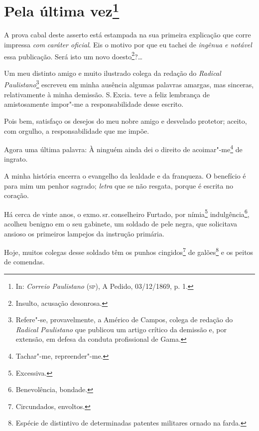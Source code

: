 \chapter{Pela última vez\footnote[*]{In: \emph{Correio Paulistano}
  (\textsc{sp}), A Pedido, 03/12/1869, p. 1.}}


A prova cabal deste asserto está estampada na sua primeira explicação
que corre impressa \emph{com} \emph{caráter oficial}. Eis o motivo por
que eu tachei de \emph{ingênua e notável} essa publicação. Será isto um
novo doesto\footnote{Insulto, acusação desonrosa.}?\ldots{}

Um meu distinto amigo e muito ilustrado colega da redação do
\emph{Radical Paulistano}\footnote{Refere"-se, provavelmente, a Américo
  de Campos, colega de redação do \emph{Radical Paulistano} que publicou
  um artigo crítico da demissão e, por extensão, em defesa da conduta
  profissional de Gama.} escreveu em minha ausência algumas palavras
amargas, mas sinceras, relativamente à minha demissão. S.\,Excia. teve a
feliz lembrança de amistosamente impor"-me a responsabilidade desse
escrito.

Pois bem, satisfaço os desejos do meu nobre amigo e desvelado protetor;
aceito, com orgulho, a responsabilidade que me impõe.

Agora uma última palavra:
À ninguém ainda dei o direito de acoimar"-me\footnote{Tachar"-me,
  repreender"-me.} de ingrato.

A minha história encerra o evangelho da lealdade e da franqueza. O
benefício é para mim um penhor sagrado; \emph{letra} que se não resgata,
porque é escrita no coração.

Há cerca de vinte anos, o exmo.\,sr.\,conselheiro Furtado, por
nímia\footnote{Excessiva.} indulgência\footnote{Benevolência,
  bondade.}, acolheu benigno em o seu gabinete, um soldado de pele
negra, que solicitava ansioso os primeiros lampejos da instrução
primária.

Hoje, muitos colegas desse soldado têm os punhos cingidos\footnote{
  Circundados, envoltos.} de galões\footnote{Espécie de distintivo de
  determinadas patentes militares ornado na farda.} e os peitos de
comendas.

